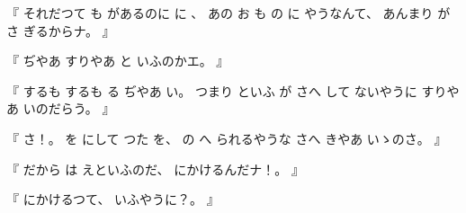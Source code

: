 %
『
それだつて
も
があるのに
に
、
%
あの
お
も
の
に
やうなんて、
%
あんまり
が
さ
ぎるからナ。
』

%
『
ぢやあ
すりやあ
と%
いふのかエ。
』

%
『
するも
するも
る
ぢやあ
い。
%
つまり
といふ
が
さへ
して
ないやうに
すりやあ
いのだらう。
』

%
『
さ！。
%
を
にして
つた
を、
%
の
へ
られるやうな
さへ
きやあ
いゝのさ。%
』

%
『
だから
は
えといふのだ、
%
にかけるんだナ！。
』

%
『
にかけるつて、
%
いふやうに？。
』


